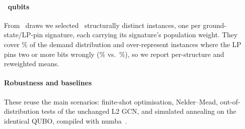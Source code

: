 \paragraph{\NLfour\ qubits} From \LfourPool\ draws we selected \LfourNStruct\ structurally distinct instances, one per ground-state/LP-pin signature, each carrying its signature's population weight. They cover \LfourCoverage\% of the demand distribution and over-represent instances where the LP pins two or more bits wrongly (\LfourSelFracTwo\% vs.\ \LfourPoolFracTwo\%), so we report per-structure and reweighted means.

\paragraph{Robustness and baselines} These reuse the main scenarios: finite-shot optimisation, Nelder--Mead, out-of-distribution tests of the unchanged L2 GCN, and simulated annealing on the identical QUBO, compiled with numba~\cite{lam2015numba}.
